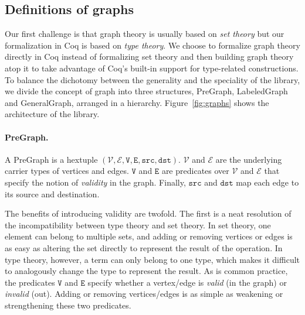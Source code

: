 \subsection{Definitions of graphs}\label{sec:mathinfra}


%


Our first challenge is that graph theory is usually based on
\emph{set theory} but our formalization in Coq is
based on \emph{type theory}. We choose to formalize graph theory
directly in Coq instead of formalizing set theory and then building
graph theory atop it to take advantage of Coq's built-in
support for type-related constructions.
To balance the dichotomy between
the generality and the speciality of the library, we divide the
concept of graph into three structures,
PreGraph, LabeledGraph and GeneralGraph, arranged in a hierarchy.
Figure~\ref{fig:graphs} shows the
architecture of the library.


\paragraph{PreGraph.}
A PreGraph is a hextuple $(\mathcal{V}, \mathcal{E}, \mathtt{V}, \mathtt{E}, \mathtt{src}, \mathtt{dst})$.  $\mathcal{V}$ and $\mathcal{E}$ are the underlying
carrier types of vertices and edges.  $\mathtt{V}$ and $\mathtt{E}$ are predicates over
$\mathcal{V}$ and $\mathcal{E}$ that specify the notion
of \emph{validity} in the graph.  Finally, $\mathtt{src}$ and $\mathtt{dst}$ map each edge to 
its source and destination.

The benefits of introducing validity are twofold. The first is a
neat resolution of the incompatibility between type theory and set theory.
In set theory, one
element can belong to multiple sets, and 
adding or removing vertices or edges is as easy as altering
the set directly to represent the result of the operation.
In type theory, however, a term can only belong
to one type, which makes it difficult
to analogously change the
type to represent the result. As is common practice, the
predicates $\mathtt{V}$ and $\mathtt{E}$ specify whether a vertex/edge is \emph{valid}
(in the graph) or \emph{invalid} (out). Adding or removing vertices/edges
is as simple as weakening or strengthening these two predicates.

